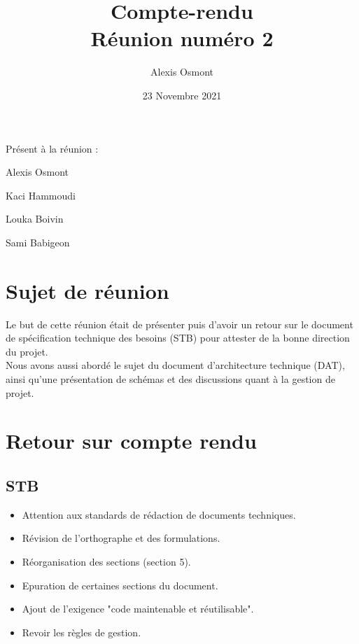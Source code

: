 \documentclass{article}
\title{
    \Huge
    Compte-rendu\\
    Réunion numéro 2\\
}
\date{\huge 23 Novembre 2021}
\author{\huge Alexis Osmont\\}
\begin{document}
\maketitle
\vspace{5cm}
    Présent à la réunion :
    \begin{description}
        \item Alexis Osmont
        \item Kaci Hammoudi
        \item Louka  Boivin
        \item Sami Babigeon
    \end{description}
\newpage

\section{Sujet de réunion}                                                                                 

Le but de cette réunion était de présenter puis d'avoir un retour sur le document de spécification technique des besoins (STB) pour attester de la bonne direction du projet.\\

Nous avons aussi abordé le sujet du document d'architecture technique (DAT), ainsi qu'une présentation de schémas et des discussions quant à la gestion de projet.
\vspace{0.5cm}

\section{Retour sur compte rendu}
\subsection{STB}

\begin{itemize}
    \item Attention aux standards de rédaction de documents techniques.
    \item Révision de l'orthographe et des formulations.
    \item Réorganisation des sections (section 5).
    \item Epuration de certaines sections du document.
    \item Ajout de l'exigence "code maintenable et réutilisable".
    \item Revoir les règles de gestion.
\end{itemize}
\end{document}
